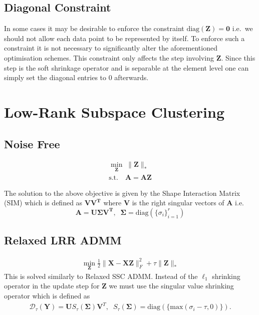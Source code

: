 \documentclass{article}
\begin{document}
\subsection{Diagonal Constraint}

In some cases it may be desirable to enforce the constraint $\textrm{diag}(\mathbf Z) = \mathbf 0$ i.e.\ we should not allow each data point to be represented by itself. To enforce such a constraint it is not necessary to significantly alter the aforementioned optimisation schemes. This constraint only affects the step involving $\mathbf Z$. Since this step is the soft shrinkage operator and is separable at the element level one can simply set the diagonal entries to $0$ afterwards.

\newpage
\section{Low-Rank Subspace Clustering}

\subsection{Noise Free}

\begin{align}
\min_{\mathbf{Z}} \;  \| \mathbf{Z} \|_* \\
\text{s.t.} \quad \mathbf{A = AZ} \nonumber
\end{align}

The solution to the above objective is given by the Shape Interaction Matrix (SIM) which is defined as $\mathbf{V  V^T}$ where $\mathbf V$ is the right singular vectors of $\mathbf A$ i.e.\
\[
\mathbf{A = U \Sigma V^T}, \;\; \mathbf \Sigma = \text{diag}(\{\sigma_i\}_{i=1}^r)
\]

\subsection{Relaxed LRR ADMM}

\begin{align}
\min_{\mathbf Z} \frac12\|\mathbf X - \mathbf X\mathbf Z\|^2_F + \tau \|\mathbf Z\|_{*}
\end{align}
This is solved similarly to Relaxed SSC ADMM. Instead of the $\ell_1$ shrinking operator in the update step for $\mathbf Z$ we must use the singular value shrinking operator which is defined as 
\begin{align}
\mathcal D_{\tau}(\mathbf Y) = \mathbf U S_{\tau}(\mathbf \Sigma) \mathbf V^T, \;\; S_{\tau}(\mathbf \Sigma) = \text{diag}(\{\text{max}(\sigma_i - \tau, 0)\}).
\end{align}
\end{document}
